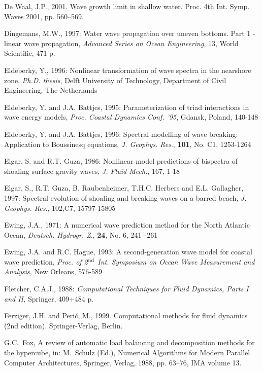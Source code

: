 \documentclass[12pt]{book}
\begin{document}
\begin{thebibliography}{10}
{De Waal}, J.P., 2001. Wave growth limit in shallow water. Proc. 4th Int. Symp. Waves 2001, pp. 560--569.

Dingemans, M.W., 1997: Water wave propagation over uneven bottoms. Part 1 -linear wave propagation,
{\it Advanced Series on Ocean Engineering}, 13, World Scientific, 471 p.

Eldeberky, Y., 1996: Nonlinear transformation of wave spectra in the nearshore zone, {\it Ph.D. thesis}, Delft
University of Technology, Department of Civil Engineering, The Netherlands

Eldeberky, Y. and J.A. Battjes, 1995: Parameterization of triad interactions in wave energy models, {\it Proc.
Coastal Dynamics Conf. '95}, Gdansk, Poland, 140-148

Eldeberky, Y. and J.A. Battjes, 1996: Spectral modelling of wave breaking: Application to Boussinesq
equations, {\it J. Geophys. Res}., {\bf 101}, No. C1, 1253-1264

Elgar, S. and R.T. Guza, 1986: Nonlinear model predictions of bispectra of shoaling surface gravity waves,
{\it J. Fluid Mech.}, 167, 1-18

Elgar, S., R.T. Guza, B. Raubenheimer, T.H.C. Herbers and E.L. Gallagher, 1997: Spectral evolution of
shoaling and breaking waves on a barred beach, {\it J. Geophys. Res}., 102,C7, 15797-15805

Ewing, J.A., 1971: A numerical wave prediction method for the North Atlantic Ocean, {\it Deutsch. Hydrogr. Z}.,
{\bf 24}, No. 6, 241$-$261

Ewing, J.A. and R.C. Hague, 1993: A second-generation wave model for coastal wave prediction, {\it Proc.
of 2$^{{\rm nd}}$ Int. Symposium on Ocean Wave Measurement and Analysis}, New Orleans, 576-589

Fletcher, C.A.J., 1988: {\it Computational Techniques for Fluid Dynamics, Parts I and II,} Springer, 409+484
p.

Ferziger, J.H. and Peri\'{c}, M., 1999. Computational methods for fluid dynamics (2nd edition).
  Springer-Verlag, Berlin.

G.C.~Fox, A review of automatic load balancing and decomposition methods for the
  hypercube, in: M.~Schulz (Ed.), Numerical Algorithms for Modern Parallel
  Computer Architectures, Springer, Verlag, 1988, pp. 63--76, IMA volume 13.


\end{thebibliography}
\end{document}
